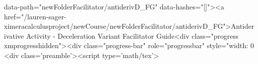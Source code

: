 data-path="newFolderFacilitator/antiderivD_FG" data-hashes="[]"><a href="/lauren-sager-ximeracalculusproject/newCourse/newFolderFacilitator/antiderivD_FG">Antiderivative Activity - Deceleration Variant Facilitator Guide<div class="progress xmprogresshidden"><div class="progress-bar" role="progressbar" style="width: 0%
<div class='preamble'><script type='math/tex'>\newenvironment {prompt}{}{}
\newcommand {\accordion }[0]{}
\newcommand {\ungraded }[0]{}
\newcommand {\xmDefaultPreamble }[0]{xmPreamble.tex}
